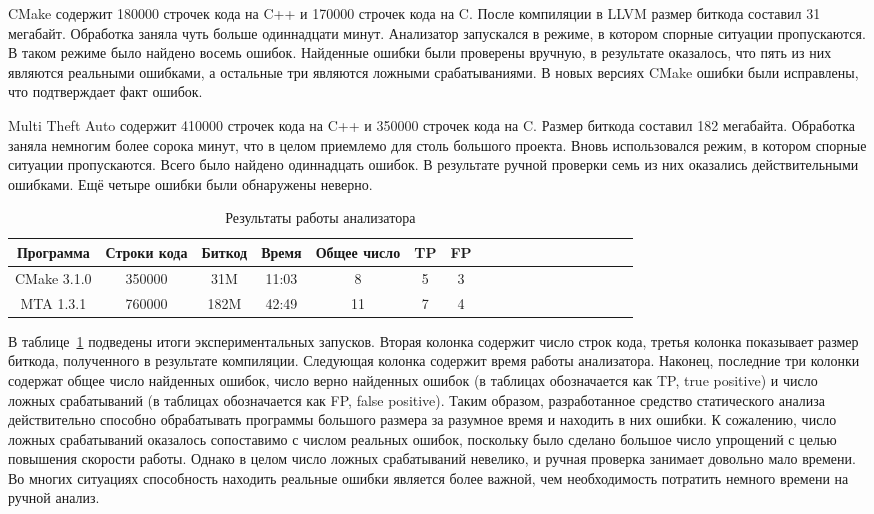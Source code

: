 CMake содержит 180000 строчек кода на C++ и 170000 строчек кода на
C. После компиляции в LLVM размер биткода составил 31
мегабайт. Обработка заняла чуть больше одиннадцати минут. Анализатор
запускался в режиме, в котором спорные ситуации пропускаются. В таком
режиме было найдено восемь ошибок. Найденные ошибки были проверены
вручную, в результате оказалось, что пять из них являются реальными
ошибками, а остальные три являются ложными срабатываниями. В новых
версиях CMake ошибки были исправлены, что подтверждает факт ошибок.

Multi Theft Auto содержит 410000 строчек кода на C++ и 350000 строчек
кода на C. Размер биткода составил 182 мегабайта. Обработка заняла
немногим более сорока минут, что в целом приемлемо для столь большого
проекта. Вновь использовался режим, в котором спорные ситуации
пропускаются. Всего было найдено одиннадцать ошибок. В результате
ручной проверки семь из них оказались действительными ошибками. Ещё
четыре ошибки были обнаружены неверно.

\begin{table}[!h]
\caption{Результаты работы анализатора}\label{tab:analyzer-results}
\centering
  \begin{tabular}{|*{18}{c|}}\hline
  Программа   & Строки кода & Биткод & Время & Общее число & TP & FP \\\hline
  CMake 3.1.0 & 350000      & 31M    & 11:03 & 8           & 5  & 3  \\\hline
  MTA 1.3.1   & 760000      & 182M   & 42:49 & 11          & 7  & 4  \\\hline
  \end{tabular}
\end{table}

В таблице~\ref{tab:analyzer-results} подведены итоги экспериментальных
запусков. Вторая колонка содержит число строк кода, третья колонка
показывает размер биткода, полученного в результате
компиляции. Следующая колонка содержит время работы
анализатора. Наконец, последние три колонки содержат общее число
найденных ошибок, число верно найденных ошибок (в таблицах
обозначается как TP, true positive) и число ложных срабатываний (в
таблицах обозначается как FP, false positive). Таким образом,
разработанное средство статического анализа действительно способно
обрабатывать программы большого размера за разумное время и находить в
них ошибки. К сожалению, число ложных срабатываний оказалось
сопоставимо с числом реальных ошибок, поскольку было сделано большое
число упрощений с целью повышения скорости работы. Однако в целом
число ложных срабатываний невелико, и ручная проверка занимает
довольно мало времени. Во многих ситуациях способность находить
реальные ошибки является более важной, чем необходимость потратить
немного времени на ручной анализ.

